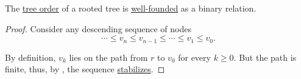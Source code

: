 \begin{lemma}\label{thm:tree_order_well_founded}
  The \hyperref[def:rooted_tree/order]{tree order} of a rooted tree is \hyperref[def:well_founded_relation]{well-founded} as a binary relation.
\end{lemma}
\begin{proof}
  Consider any descending sequence of nodes
  \begin{equation*}
    \cdots \leq v_n \leq v_{n-1} \leq \cdots \leq v_1 \leq v_0.
  \end{equation*}

  By definition, \( v_k \) lies on the path from \( r \) to \( v_0 \) for every \( k \geq 0 \). But the path is finite, thus, by , the sequence \hyperref[def:stabilizing_sequence]{stabilizes}.
\end{proof}

